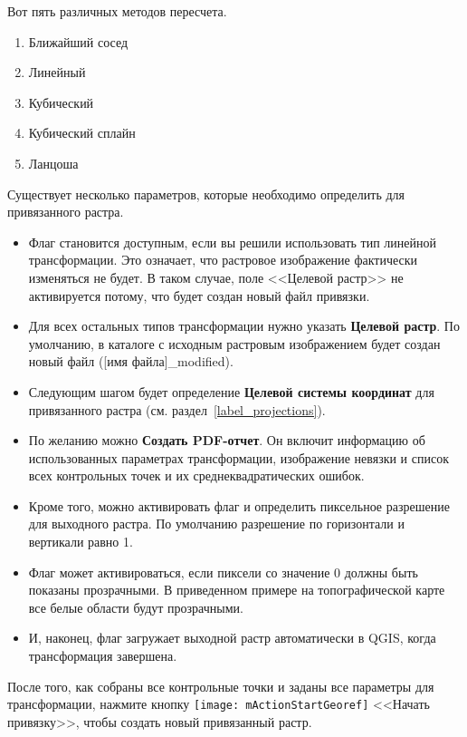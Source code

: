 Вот пять различных методов пересчета.

\begin{enumerate}
\item Ближайший сосед
\item Линейный
\item Кубический
\item Кубический сплайн
\item Ланцоша
\end{enumerate}


Существует несколько параметров, которые необходимо определить для
привязанного растра.

\begin{itemize}[label=--]
\item Флаг  становится доступным, если
вы решили использовать тип линейной трансформации. Это
означает, что растровое изображение фактически изменяться не будет.
В таком случае, поле <<Целевой растр>> не активируется потому, что
будет создан новый файл привязки.
\item Для всех остальных типов трансформации нужно указать
\textbf{Целевой растр}. По умолчанию, в каталоге с исходным растровым
изображением будет создан новый файл ([имя файла]\_modified).
\item Следующим шагом будет определение \textbf{Целевой системы координат}
для привязанного растра (см. раздел~\ref{label_projections}).
\item По желанию можно \textbf{Создать PDF-отчет}. Он включит
информацию об использованных параметрах трансформации, изображение
невязки и список всех контрольных точек и их среднеквадратических ошибок.
\item Кроме того, можно активировать флаг
 и определить пиксельное разрешение
для выходного растра. По умолчанию разрешение по горизонтали и вертикали
равно 1.
\item Флаг 
может активироваться, если пиксели со значение 0 должны быть показаны
прозрачными. В приведенном примере на топографической карте все белые
области будут прозрачными.
\item И, наконец, флаг  загружает
выходной растр автоматически в QGIS, когда трансформация завершена.
\end{itemize}

\label{georeferencer_running}

После того, как собраны все контрольные точки и заданы все параметры для
трансформации, нажмите кнопку \texttt{[image: mActionStartGeoref]}
<<Начать привязку>>, чтобы создать новый привязанный растр.
